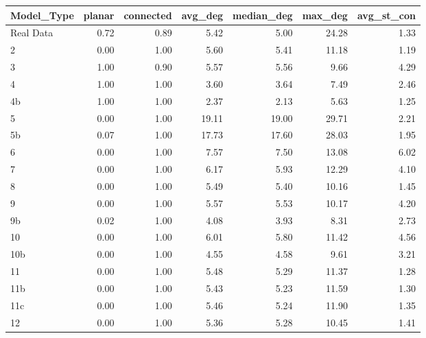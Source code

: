 \begin{tabular}{lrrrrrr}
\toprule
Model_Type & planar & connected & avg_deg & median_deg & max_deg & avg_st_con \\
\midrule
Real Data & 0.72 & 0.89 & 5.42 & 5.00 & 24.28 & 1.33 \\
2 & 0.00 & 1.00 & 5.60 & 5.41 & 11.18 & 1.19 \\
3 & 1.00 & 0.90 & 5.57 & 5.56 & 9.66 & 4.29 \\
4 & 1.00 & 1.00 & 3.60 & 3.64 & 7.49 & 2.46 \\
4b & 1.00 & 1.00 & 2.37 & 2.13 & 5.63 & 1.25 \\
5 & 0.00 & 1.00 & 19.11 & 19.00 & 29.71 & 2.21 \\
5b & 0.07 & 1.00 & 17.73 & 17.60 & 28.03 & 1.95 \\
6 & 0.00 & 1.00 & 7.57 & 7.50 & 13.08 & 6.02 \\
7 & 0.00 & 1.00 & 6.17 & 5.93 & 12.29 & 4.10 \\
8 & 0.00 & 1.00 & 5.49 & 5.40 & 10.16 & 1.45 \\
9 & 0.00 & 1.00 & 5.57 & 5.53 & 10.17 & 4.20 \\
9b & 0.02 & 1.00 & 4.08 & 3.93 & 8.31 & 2.73 \\
10 & 0.00 & 1.00 & 6.01 & 5.80 & 11.42 & 4.56 \\
10b & 0.00 & 1.00 & 4.55 & 4.58 & 9.61 & 3.21 \\
11 & 0.00 & 1.00 & 5.48 & 5.29 & 11.37 & 1.28 \\
11b & 0.00 & 1.00 & 5.43 & 5.23 & 11.59 & 1.30 \\
11c & 0.00 & 1.00 & 5.46 & 5.24 & 11.90 & 1.35 \\
12 & 0.00 & 1.00 & 5.36 & 5.28 & 10.45 & 1.41 \\
\bottomrule
\end{tabular}
